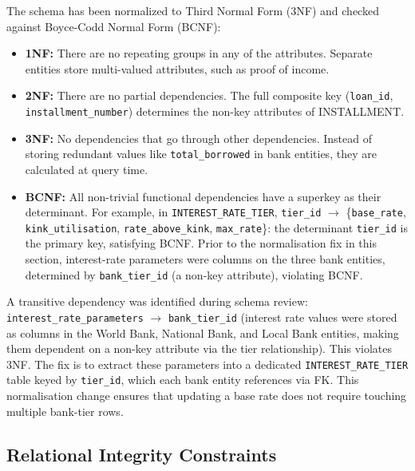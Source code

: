 \documentclass[12pt,a4paper]{report}
\begin{document}
The schema has been normalized to Third Normal Form (3NF) and checked against Boyce-Codd Normal Form (BCNF):

\begin{itemize}[noitemsep]
\item \textbf{1NF:} There are no repeating groups in any of the attributes. Separate entities store multi-valued attributes, such as proof of income.
\item \textbf{2NF:} There are no partial dependencies. The full composite key (\texttt{loan\_id}, \texttt{installment\_number}) determines the non-key attributes of INSTALLMENT.
\item \textbf{3NF:} No dependencies that go through other dependencies. Instead of storing redundant values like \texttt{total\_borrowed} in bank entities, they are calculated at query time.
\item \textbf{BCNF:} All non-trivial functional dependencies have a superkey as their determinant. For example, in \texttt{INTEREST\_RATE\_TIER}, \texttt{tier\_id} $\to$ \{\texttt{base\_rate}, \texttt{kink\_utilisation}, \texttt{rate\_above\_kink}, \texttt{max\_rate}\}: the determinant \texttt{tier\_id} is the primary key, satisfying BCNF. Prior to the normalisation fix in this section, interest-rate parameters were columns on the three bank entities, determined by \texttt{bank\_tier\_id} (a non-key attribute), violating BCNF.
\end{itemize}

A transitive dependency was identified during schema review: \texttt{interest\_rate\_parameters} $\to$ \texttt{bank\_tier\_id} (interest rate values were stored as columns in the World Bank, National Bank, and Local Bank entities, making them dependent on a non-key attribute via the tier relationship). This violates 3NF. The fix is to extract these parameters into a dedicated \texttt{INTEREST\_RATE\_TIER} table keyed by \texttt{tier\_id}, which each bank entity references via FK. This normalisation change ensures that updating a base rate does not require touching multiple bank-tier rows.

\subsection{Relational Integrity Constraints}
\label{sec:integrity-constraints}
\end{document}

